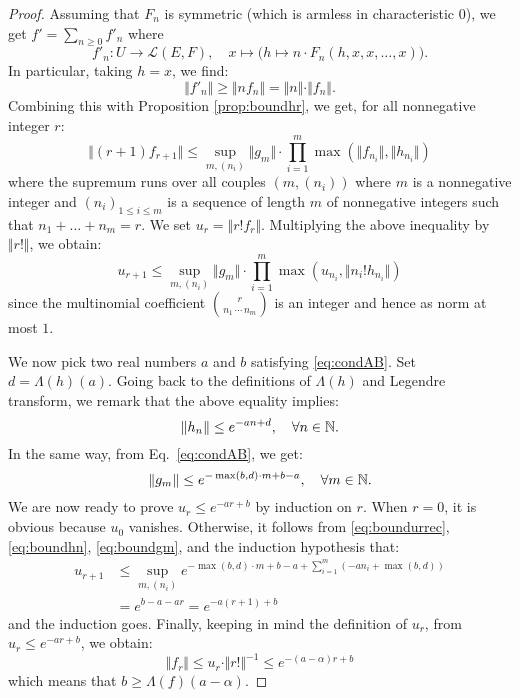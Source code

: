 \documentclass{sig-alternate}
\begin{document}
\begin{proof}
Assuming that $F_n$ is symmetric (which is armless in characteristic 
$0$), we get $f' = \sum_{n \geq 0} f'_n$ where
$$f'_n : U \to \mathcal L(E,F), \quad
x \mapsto \big(h \mapsto n \cdot F_n(h, x, x, \ldots, x)\big).$$
In particular, taking $h = x$, we find:
\begin{equation}
\label{eq:normderivative}
\Vert f'_n \Vert \geq \Vert n f_n \Vert = 
\Vert n \Vert \cdot \Vert f_n \Vert.
\end{equation}
Combining this with Proposition \ref{prop:boundhr}, we get, for all
nonnegative integer $r$:
$$\Vert (r+1) f_{r+1} \Vert \leq
  \sup_{m, (n_i)} \Vert g_m \Vert \cdot 
  \prod_{i=1}^m \max(\Vert f_{n_i} \Vert, \Vert h_{n_i} \Vert)$$
where the supremum runs over all couples $(m, (n_i))$ where $m$
is a nonnegative integer and $(n_i)_{1 \leq i \leq m}$ is a sequence of
length $m$ of nonnegative integers such that $n_1 + \ldots + n_m = r$.
We set $u_r = \Vert r! f_r \Vert$. Multiplying the above inequality by
$\Vert r! \Vert$, we obtain:
\begin{equation}
\label{eq:boundurrec}
u_{r+1} \leq
  \sup_{m, (n_i)} \Vert g_m \Vert \cdot 
  \prod_{i=1}^m \max(u_{n_i}, \Vert n_i! h_{n_i} \Vert)
\end{equation}
since the multinomial coefficient $\binom r {\!n_1 \, \cdots \, n_m\!}$
is an integer and hence as norm at most $1$.

We now pick two real numbers $a$ and $b$ satisfying \eqref{eq:condAB}.
Set $d = \Lambda(h)(a)$. Going back to the definitions of $\Lambda (h)$ and Legendre transform, we remark that
the above equality implies:
\begin{equation}
\label{eq:boundhn}
\Vert h_n \Vert \leq e^{- a n + d},
  \quad \forall n \in \mathbb N.
\end{equation}
In the same way, from Eq.~\eqref{eq:condAB}, we get:
\begin{equation}
\label{eq:boundgm}
\Vert g_m \Vert \leq e^{- \max(b,d)\cdot m + b - a},
  \quad \forall m \in \mathbb N.
\end{equation}
We are now ready to prove $u_r \leq e^{-ar + b}$ by induction on $r$.
When $r = 0$, it is obvious because $u_0$ vanishes. Otherwise, it
follows from \eqref{eq:boundurrec}, \eqref{eq:boundhn}, \eqref{eq:boundgm}, 
and the induction hypothesis that:
\begin{align*}
u_{r+1} 
& \leq \sup_{m, (n_i)}
    e^{ -\max(b,d)\cdot m + b - a + \sum_{i=1}^m (-a n_i + \max(b,d))} \\
& = e^{ b - a - a r } = e^{ -a (r+1) + b}
\end{align*}
and the induction goes.
Finally, keeping in mind the definition of $u_r$, from $u_r \leq 
e^{-a r + b}$, we obtain:
$$\Vert f_r \Vert \leq u_r \cdot \Vert r! \Vert^{-1} \leq
e^{-(a - \alpha) r + b}$$
which means that $b \geq \Lambda(f)(a - \alpha)$.
\end{proof}
\end{document}
